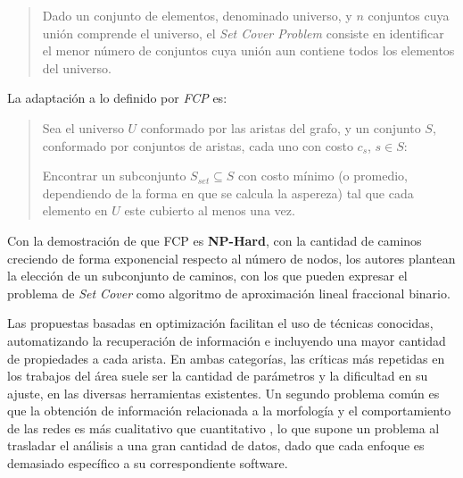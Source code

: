 \documentclass{article}
\begin{document}
\begin{quote}
Dado un conjunto de elementos, denominado universo, y $n$ conjuntos cuya unión comprende el universo, el {\it Set Cover Problem} consiste en identificar el menor n\'umero de conjuntos cuya unión aun contiene todos los elementos del universo.
\end{quote}

La adaptaci\'on a lo definido por {\it FCP} es: 
\begin{quote}
Sea el universo $U$ conformado por las aristas del grafo, y un conjunto $S$, conformado por conjuntos de aristas, cada uno con costo $c_s$, $s \in S$:

Encontrar un subconjunto $S_{set} \subseteq S$ con costo m\'inimo (o promedio, dependiendo de la forma en que se calcula la aspereza) tal que cada elemento en $U$ este cubierto al menos una vez.
\end{quote}

Con la demostraci\'on de que FCP es {\bf NP-Hard}, con la cantidad de caminos creciendo de forma exponencial respecto al n\'umero de nodos, los autores plantean la elecci\'on de un subconjunto de caminos, con los que pueden expresar el problema de {\it Set Cover} como algoritmo de aproximaci\'on lineal fraccional binario.


\bigskip
Las propuestas basadas en optimizaci\'on facilitan el uso de t\'ecnicas conocidas, automatizando la recuperaci\'on de informaci\'on e incluyendo una mayor cantidad de propiedades a cada arista.
En ambas categor\'ias, las cr\'iticas m\'as repetidas en los trabajos del \'area suele ser la cantidad de par\'ametros y la dificultad en su ajuste, en las diversas herramientas existentes. Un segundo problema com\'un es que la obtenci\'on de informaci\'on relacionada a la morfolog\'ia y el comportamiento de las redes es m\'as cualitativo que cuantitativo \cite{asgharzadeh2018computational}\cite{qiu2014quantitative}, lo que supone un problema al trasladar el  an\'alisis a una gran cantidad de datos, dado que cada enfoque es demasiado espec\'ifico a su correspondiente software.
\end{document}

